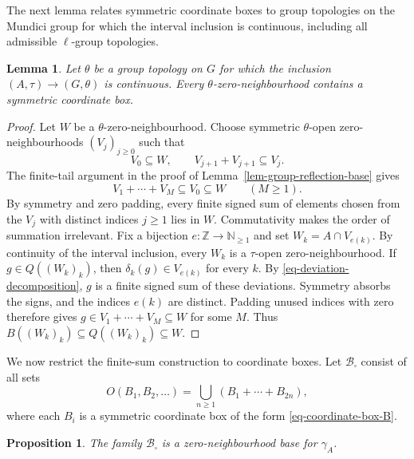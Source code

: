 \documentclass[preprint,3p]{elsarticle}
\theoremstyle{plain}
\newtheorem{lem}[thm]{Lemma}
\newtheorem{prop}[thm]{Proposition}
\theoremstyle{definition}
\numberwithin{equation}{section}
\begin{document}
The next lemma relates symmetric coordinate boxes to group
topologies on the Mundici group for which the interval inclusion
is continuous, including all admissible $\ell$-group topologies.

\begin{lem}
\label{lem-coordinate-box-refinement}
Let $\theta$ be a group topology on $G$ for which the inclusion
$(A,\tau)\longrightarrow(G,\theta)$ is continuous.
Every $\theta$-zero-neighbourhood contains a symmetric coordinate box.
\end{lem}

\begin{proof}
Let $W$ be a $\theta$-zero-neighbourhood.  Choose symmetric
$\theta$-open zero-neighbourhoods $(V_j)_{j\geq0}$ such that
\[
 V_0\subseteq W,\qquad V_{j+1}+V_{j+1}\subseteq V_j.
\]
The finite-tail argument in the proof of
Lemma~\ref{lem-group-reflection-base} gives
\[
 V_1+\cdots+V_M\subseteq V_0\subseteq W
 \qquad(M\geq1).
\]
By symmetry and zero padding, every finite signed sum of elements
chosen from the $V_j$ with distinct indices $j\geq1$ lies in $W$.
Commutativity makes the order of summation irrelevant.
Fix a bijection $e\colon\mathbb Z\longrightarrow\mathbb N_{\geq1}$
and set $W_k=A\cap V_{e(k)}$.  By continuity of the interval
inclusion, every $W_k$ is a $\tau$-open zero-neighbourhood.
If $g\in Q((W_k)_k)$, then
$\delta_k(g)\in V_{e(k)}$ for every $k$.
By \eqref{eq-deviation-decomposition}, $g$ is a finite signed sum
of these deviations.  Symmetry absorbs the signs, and the indices
$e(k)$ are distinct.  Padding unused indices with zero therefore gives
$g\in V_1+\cdots+V_M\subseteq W$ for some $M$.
Thus $B((W_k)_k)\subseteq Q((W_k)_k)\subseteq W$.
\end{proof}

We now restrict the finite-sum construction to coordinate boxes.
Let $\mathcal B_\square$ consist of all sets
\begin{equation}
\label{eq-coordinate-box-group-base}
 O(B_1,B_2,\ldots)=\bigcup_{n\geq1}(B_1+\cdots+B_{2n}),
\end{equation}
where each $B_i$ is a symmetric coordinate box of the form
\eqref{eq-coordinate-box-B}.

\begin{prop}
\label{prop-coordinate-box-topology}
The family $\mathcal B_\square$ is a zero-neighbourhood base for
$\gamma_A$.
\end{prop}
\end{document}
